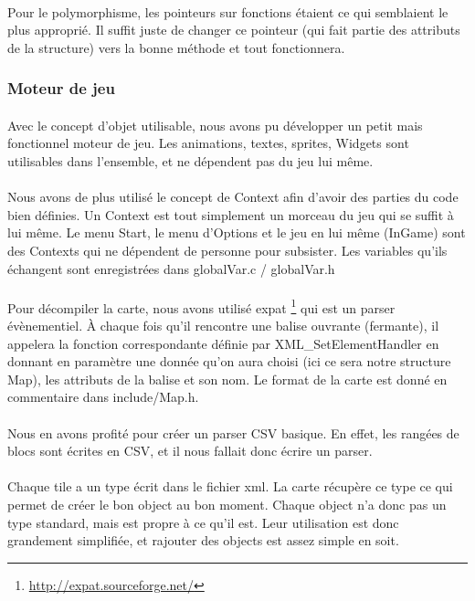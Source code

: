 \paragraph{} Pour le polymorphisme, les pointeurs sur fonctions étaient ce qui semblaient le plus approprié. Il suffit juste de changer ce pointeur (qui fait partie des attributs de la structure) vers la bonne méthode et tout fonctionnera.

\subsubsection{Moteur de jeu}

\paragraph{} Avec le concept d'objet utilisable, nous avons pu développer un petit mais fonctionnel moteur de jeu. Les animations, textes, sprites, Widgets sont utilisables dans l'ensemble, et ne dépendent pas du jeu lui même.
\paragraph{} Nous avons de plus utilisé le concept de Context afin d'avoir des parties du code bien définies. Un Context est tout simplement un morceau du jeu qui se suffit à lui même. Le menu Start, le menu d'Options et le jeu en lui même (InGame) sont des Contexts qui ne dépendent de personne pour subsister. Les variables qu'ils échangent sont enregistrées dans globalVar.c / globalVar.h
\paragraph{} Pour décompiler la carte, nous avons utilisé expat \footnote{\url{http://expat.sourceforge.net/}} qui est un parser évènementiel. À chaque fois qu'il rencontre une balise ouvrante (fermante), il appelera la fonction correspondante définie par XML\_SetElementHandler en donnant en paramètre une donnée qu'on aura choisi (ici ce sera notre structure Map), les attributs de la balise et son nom. Le format de la carte est donné en commentaire dans include/Map.h.
\paragraph{} Nous en avons profité pour créer un parser CSV basique. En effet, les rangées de blocs sont écrites en CSV, et il nous fallait donc écrire un parser.
\paragraph{} Chaque tile a un type écrit dans le fichier xml. La carte récupère ce type ce qui permet de créer le bon object au bon moment. Chaque object n'a donc pas un type standard, mais est propre à ce qu'il est. Leur utilisation est donc grandement simplifiée, et rajouter des objects est assez simple en soit.

